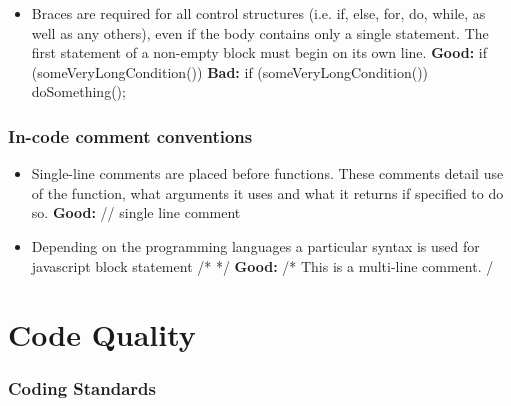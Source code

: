 \documentclass[10pt]{article}
\begin{document}
\begin{itemize}
	      \item Braces are required for all control structures (i.e. if, else, for, do, while, as well as any others), even if the body contains only a single statement. The first statement of a non-empty block must begin on its own line.
        \newline
	        \textbf{Good:}
	       \newline if (someVeryLongCondition())
	        \newline \textbf{Bad:}
	        \newline  if (someVeryLongCondition())
            \newline doSomething();

        \end{itemize}
	    \subsubsection{In-code comment conventions}
	    \begin{itemize}
        \item	Single-line comments are placed before functions. These comments detail use of the function, what arguments it uses and what it returns if specified to do so.
        \newline
	        \textbf{Good:}
	        \newline // single line comment
	        \newline 
	        
        \item Depending on the programming languages a particular syntax is used for javascript block statement /* */ 
        \newline
	        \textbf{Good:}
	        \newline /*
	        \newline *
	        \newline * This is a multi-line comment.
	        \newline */
	        
        \end{itemize}
    
    \section{Code Quality}
    \subsubsection{Coding Standards}
\end{document}
